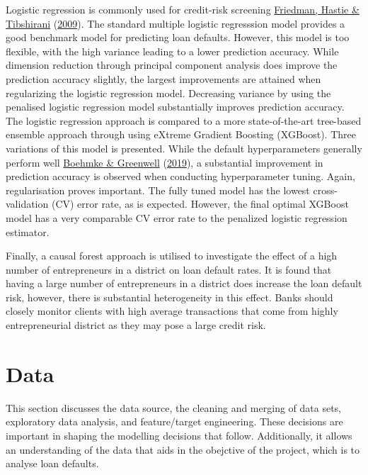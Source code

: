 \documentclass[11pt,preprint, authoryear]{elsarticle}
\numberwithin{equation}{section}
\numberwithin{figure}{section}
\numberwithin{table}{section}
\begin{document}
Logistic regression is commonly used for credit-risk screening
\protect\hyperlink{ref-ESL}{Friedman, Hastie \& Tibshirani}
(\protect\hyperlink{ref-ESL}{2009}). The standard multiple logistic
regresssion model provides a good benchmark model for predicting loan
defaults. However, this model is too flexible, with the high variance
leading to a lower prediction accuracy. While dimension reduction
through principal component analysis does improve the prediction
accuracy slightly, the largest improvements are attained when
regularizing the logistic regression model. Decreasing variance by using
the penalised logistic regression model substantially improves
prediction accuracy. The logistic regression approach is compared to a
more state-of-the-art tree-based ensemble approach through using eXtreme
Gradient Boosting (XGBoost). Three variations of this model is
presented. While the default hyperparameters generally perform well
\protect\hyperlink{ref-Boehmke}{Boehmke \& Greenwell}
(\protect\hyperlink{ref-Boehmke}{2019}), a substantial improvement in
prediction accuracy is observed when conducting hyperparameter tuning.
Again, regularisation proves important. The fully tuned model has the
lowest cross-validation (CV) error rate, as is expected. However, the
final optimal XGBoost model has a very comparable CV error rate to the
penalized logistic regression estimator.

Finally, a causal forest approach is utilised to investigate the effect
of a high number of entrepreneurs in a district on loan default rates.
It is found that having a large number of entrepreneurs in a district
does increase the loan default risk, however, there is substantial
heterogeneity in this effect. Banks should closely monitor clients with
high average transactions that come from highly entrepreneurial district
as they may pose a large credit risk.

\hypertarget{data}{%
\section{\texorpdfstring{Data \label{Data}}{Data }}\label{data}}

This section discusses the data source, the cleaning and merging of data
sets, exploratory data analysis, and feature/target engineering. These
decisions are important in shaping the modelling decisions that follow.
Additionally, it allows an understanding of the data that aids in the
obejctive of the project, which is to analyse loan defaults.
\end{document}
